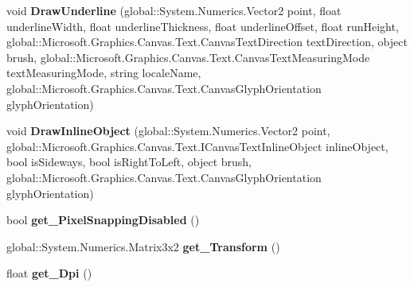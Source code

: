 \begin{DoxyCompactItemize}
\item 
\mbox{\label{interface_microsoft_1_1_graphics_1_1_canvas_1_1_text_1_1_i_canvas_text_renderer_a2e1cdd345444973833ad4a9f67ce1601}} 
void {\bfseries Draw\+Underline} (global\+::\+System.\+Numerics.\+Vector2 point, float underline\+Width, float underline\+Thickness, float underline\+Offset, float run\+Height, global\+::\+Microsoft.\+Graphics.\+Canvas.\+Text.\+Canvas\+Text\+Direction text\+Direction, object brush, global\+::\+Microsoft.\+Graphics.\+Canvas.\+Text.\+Canvas\+Text\+Measuring\+Mode text\+Measuring\+Mode, string locale\+Name, global\+::\+Microsoft.\+Graphics.\+Canvas.\+Text.\+Canvas\+Glyph\+Orientation glyph\+Orientation)
\item 
\mbox{\label{interface_microsoft_1_1_graphics_1_1_canvas_1_1_text_1_1_i_canvas_text_renderer_a4ee8342ead2546751b855325b3e50a38}} 
void {\bfseries Draw\+Inline\+Object} (global\+::\+System.\+Numerics.\+Vector2 point, global\+::\+Microsoft.\+Graphics.\+Canvas.\+Text.\+I\+Canvas\+Text\+Inline\+Object inline\+Object, bool is\+Sideways, bool is\+Right\+To\+Left, object brush, global\+::\+Microsoft.\+Graphics.\+Canvas.\+Text.\+Canvas\+Glyph\+Orientation glyph\+Orientation)
\item 
\mbox{\label{interface_microsoft_1_1_graphics_1_1_canvas_1_1_text_1_1_i_canvas_text_renderer_a47f1c1f5b81a4b3e71ddf01f64d0e1e9}} 
bool {\bfseries get\+\_\+\+Pixel\+Snapping\+Disabled} ()
\item 
\mbox{\label{interface_microsoft_1_1_graphics_1_1_canvas_1_1_text_1_1_i_canvas_text_renderer_a7a6a6deb82895cb39ac5fd578ed86cfd}} 
global\+::\+System.\+Numerics.\+Matrix3x2 {\bfseries get\+\_\+\+Transform} ()
\item 
\mbox{\label{interface_microsoft_1_1_graphics_1_1_canvas_1_1_text_1_1_i_canvas_text_renderer_a6dde43e44cf9d35e89b72e336e4aa41c}} 
float {\bfseries get\+\_\+\+Dpi} ()
\item 
\mbox{\label{interface_microsoft_1_1_graphics_1_1_canvas_1_1_text_1_1_i_canvas_text_renderer_a251cf38ca7077b36bbfacf617f946c68}} 

\end{DoxyCompactItemize}
